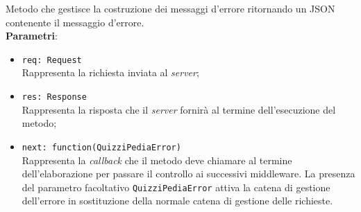 \begin{itemize}
\begin{itemize}
		Metodo che gestisce la costruzione dei messaggi d'errore ritornando un JSON contenente il messaggio d'errore.\\
		\textbf{Parametri}:
		\begin{itemize}
			\item \texttt{req: Request}\\
			Rappresenta la richiesta inviata al \textit{server};
			\item \texttt{res: Response}\\
			Rappresenta la risposta che il \textit{server} fornirà al termine dell'esecuzione del metodo;
			\item \texttt{next: function(QuizziPediaError)}\\
			Rappresenta la \textit{callback} che il metodo deve chiamare al termine dell'elaborazione per passare il controllo ai successivi middleware. La presenza del parametro facoltativo \texttt{QuizziPediaError} attiva la catena di gestione dell'errore in sostituzione della normale catena di gestione delle richieste.
		\end{itemize}
	\end{itemize}
\end{itemize}

